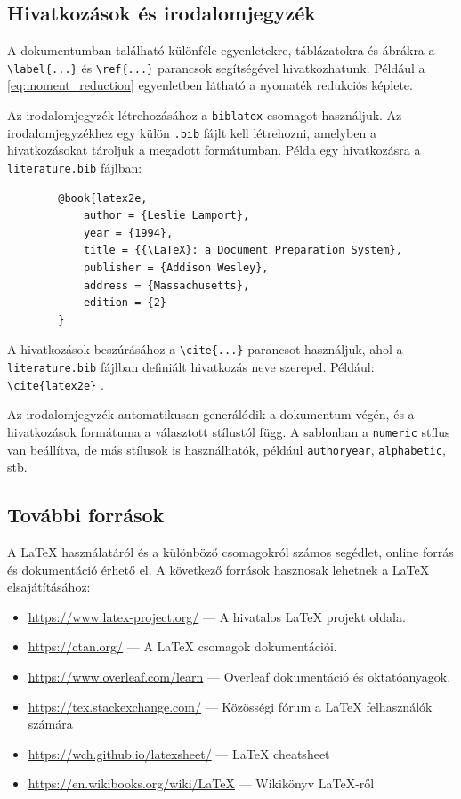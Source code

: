 \documentclass[fleqn,12pt]{article}
\begin{document}
    \subsection{Hivatkozások és irodalomjegyzék}

        A dokumentumban található különféle egyenletekre, táblázatokra és ábrákra a \texttt{\textbackslash label\{...\}} és \texttt{\textbackslash ref\{...\}} parancsok segítségével hivatkozhatunk. Például a \eqref{eq:moment_reduction} egyenletben látható a nyomaték redukciós képlete.

        \vspace{1em}
        Az irodalomjegyzék létrehozásához a \texttt{biblatex} csomagot használjuk. Az irodalomjegyzékhez egy külön \texttt{.bib} fájlt kell létrehozni, amelyben a hivatkozásokat tároljuk a megadott formátumban.
        Példa egy hivatkozásra a \texttt{literature.bib} fájlban:
        \begin{verbatim}
        @book{latex2e,
            author = {Leslie Lamport},
            year = {1994},
            title = {{\LaTeX}: a Document Preparation System},
            publisher = {Addison Wesley},
            address = {Massachusetts},
            edition = {2}
        }
        \end{verbatim}

        A hivatkozások beszúrásához a \texttt{\textbackslash cite\{...\}} parancsot használjuk, ahol a \texttt{literature.bib} fájlban definiált hivatkozás neve szerepel. Például: \verb|\cite{latex2e}| \cite{latex2e}. 
        
        \vspace{1em}
        Az irodalomjegyzék automatikusan generálódik a dokumentum végén, és a hivatkozások formátuma a választott stílustól függ. A sablonban a \texttt{numeric} stílus van beállítva, de más stílusok is használhatók, például \texttt{authoryear}, \texttt{alphabetic}, stb.

    \subsection{További források}

        A \LaTeX{} használatáról és a különböző csomagokról számos segédlet, online forrás és dokumentáció érhető el. A következő források hasznosak lehetnek a \LaTeX{} elsajátításához:
        \begin{itemize}
            \item \url{https://www.latex-project.org/} --- A hivatalos \LaTeX{} projekt oldala.
            \item \url{https://ctan.org/} --- A \LaTeX{} csomagok dokumentációi.
            \item \url{https://www.overleaf.com/learn} --- Overleaf dokumentáció és oktatóanyagok.
            \item \url{https://tex.stackexchange.com/} --- Közösségi fórum a \LaTeX{} felhasználók számára
            \item \url{https://wch.github.io/latexsheet/} --- \LaTeX{} cheatsheet
            \item \url{https://en.wikibooks.org/wiki/LaTeX} --- Wikikönyv \LaTeX{}-ről
        \end{itemize}
\end{document}
